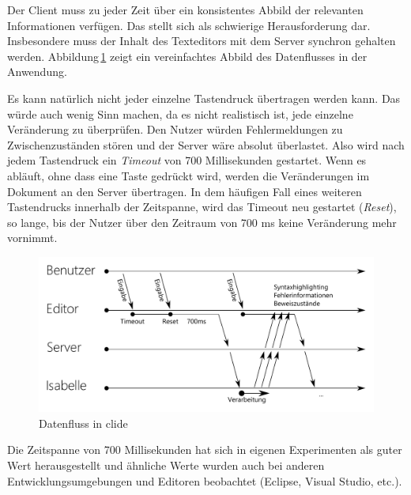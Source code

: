 Der Client muss zu jeder Zeit über ein konsistentes Abbild der relevanten Informationen verfügen.
Das stellt sich als schwierige Herausforderung dar. Insbesondere muss der Inhalt des Texteditors
mit dem Server synchron gehalten werden. Abbildung\,\ref{fig:diagram-workflow} zeigt ein
vereinfachtes Abbild des Datenflusses in der Anwendung. 

Es kann natürlich nicht jeder einzelne Tastendruck übertragen werden kann. Das würde auch wenig Sinn
machen, da es nicht realistisch ist, jede einzelne Veränderung zu überprüfen. Den Nutzer würden
Fehlermeldungen zu Zwischenzuständen stören und der Server wäre absolut überlastet. Also wird nach
jedem Tastendruck ein \textit{Timeout} von 700 Millisekunden gestartet. Wenn es abläuft, ohne dass
eine Taste gedrückt wird, werden die Veränderungen im Dokument an den Server übertragen. In dem
häufigen Fall eines weiteren Tastendrucks innerhalb der Zeitspanne, wird das Timeout neu gestartet
(\textit{Reset}), so lange, bis der Nutzer über den Zeitraum von 700 ms keine Veränderung mehr
vornimmt.


\begin{figure}[ht]
\includegraphics[width=\linewidth]{images/diagram-workflow}
  \caption{Datenfluss in clide}  
  \label{fig:diagram-workflow}
\end{figure}

Die Zeitspanne von 700 Millisekunden hat sich in eigenen Experimenten als guter Wert herausgestellt
und ähnliche Werte wurden auch bei anderen Entwicklungsumgebungen und Editoren beobachtet (Eclipse,
Visual Studio, etc.).
